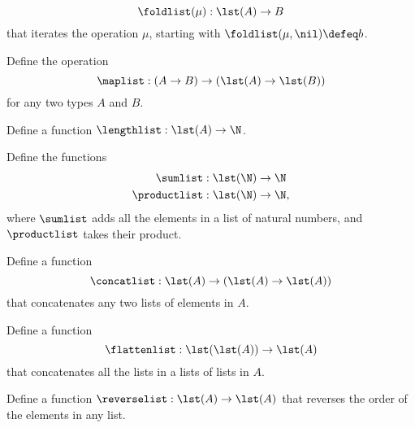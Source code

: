 \begin{exercises}
\begin{subexenum}
    \begin{equation*}
      \foldlist(\mu) : \lst(A)\to B
    \end{equation*}
    that iterates the operation $\mu$, starting with $\foldlist(\mu,\nil)\defeq b$.
  \item Define the operation
    \begin{equation*}
      \maplist : (A\to B) \to (\lst(A)\to\lst(B))
    \end{equation*}
    for any two types $A$ and $B$.
  \item Define a function $\lengthlist:\lst(A)\to\N$.
  \item Define the functions
    \begin{align*}
      \sumlist & : \lst(\N) \to \N \\
      \productlist & : \lst(\N)\to\N,
    \end{align*}
    where $\sumlist$ adds all the elements in a list of natural numbers, and $\productlist$ takes their product.
  \item Define a function
    \begin{equation*}
      \concatlist : \lst(A) \to (\lst(A) \to \lst(A))
    \end{equation*}
    that concatenates any two lists of elements in $A$.
  \item Define a function
    \begin{equation*}
      \flattenlist : \lst(\lst(A)) \to \lst(A)
    \end{equation*}
    that concatenates all the lists in a lists of lists in $A$.
  \item Define a function $\reverselist : \lst(A) \to \lst(A)$ that reverses the order of the elements in any list.
  \end{subexenum}
\end{exercises}

